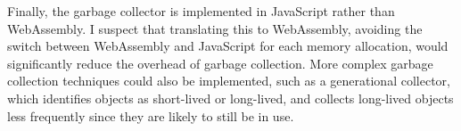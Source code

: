 Finally, the garbage collector is implemented in JavaScript rather than WebAssembly. I suspect that translating this to WebAssembly, avoiding the switch between WebAssembly and JavaScript for each memory allocation, would significantly reduce the overhead of garbage collection. More complex garbage collection techniques could also be implemented, such as a generational collector, which identifies objects as short-lived or long-lived, and collects long-lived objects less frequently since they are likely to still be in use.



